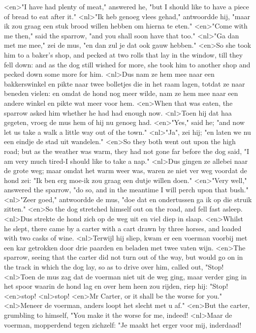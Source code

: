 <en>"I have had plenty of meat," answered he, "but I should like to have a piece of bread to eat after it."
<nl>"Ik heb genoeg vlees gehad," antwoordde hij, "maar ik zou graag een stuk brood willen hebben om hierna te eten."
<en>"Come with me then," said the sparrow, "and you shall soon have that too."
<nl>"Ga dan met me mee," zei de mus, "en dan zul je dat ook gauw hebben."
<en>So she took him to a baker’s shop, and pecked at two rolls that lay in the window, till they fell down: and as the dog still wished for more, she took him to another shop and pecked down some more for him.
<nl>Dus nam ze hem mee naar een bakkerswinkel en pikte naar twee bolletjes die in het raam lagen, totdat ze naar beneden vielen: en omdat de hond nog meer wilde, nam ze hem mee naar een andere winkel en pikte wat meer voor hem.
<en>When that was eaten, the sparrow asked him whether he had had enough now.
<nl>Toen hij dat haa gegeten, vroeg de mus hem of hij nu genoeg had.
<en>"Yes," said he; "and now let us take a walk a little way out of the town."
<nl>"Ja", zei hij; "en laten we nu een eindje de stad uit wandelen."
<en>So they both went out upon the high road; but as the weather was warm, they had not gone far before the dog said, "I am very much tired-I should like to take a nap."
<nl>Dus gingen ze allebei naar de grote weg; maar omdat het warm weer was, waren ze niet ver weg voordat de hond zei: "Ik ben erg moe-ik zou graag een dutje willen doen."
<en>"Very well," answered the sparrow, "do so, and in the meantime I will perch upon that bush."
<nl>"Zeer goed," antwoordde de mus, "doe dat en ondertussen ga ik op die struik zitten."
<en>So the dog stretched himself out on the road, and fell fast asleep.
<nl>Dus strekte de hond zich op de weg uit en viel diep in slaap.
<en>Whilst he slept, there came by a carter with a cart drawn by three horses, and loaded with two casks of wine.
<nl>Terwijl hij sliep, kwam er een voerman voorbij met een kar getrokken door drie paarden en beladen met twee vaten wijn.
<en>The sparrow, seeing that the carter did not turn out of the way, but would go on in the track in which the dog lay, so as to drive over him, called out, "Stop!
<nl>Toen de mus zag dat de voerman niet uit de weg ging, maar verder ging in het spoor waarin de hond lag en  over hem heen zou rijden, riep hij: "Stop!
<en>stop!
<nl>stop!
<en>Mr Carter, or it shall be the worse for you."
<nl>Meneer de voerman, anders loopt  het slecht met u af."
<en>But the carter, grumbling to himself, "You make it the worse for me, indeed!
<nl>Maar de voerman,  mopperdend tegen zichzelf: "Je maakt het erger voor mij, inderdaad!
